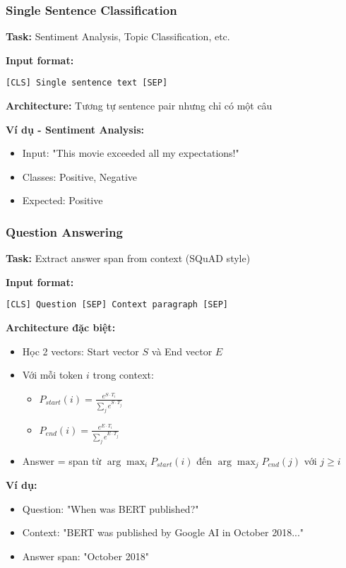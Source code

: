\subsubsection{Single Sentence Classification}  
\textbf{Task:} Sentiment Analysis, Topic Classification, etc.

\textbf{Input format:}
\begin{verbatim}
[CLS] Single sentence text [SEP]
\end{verbatim}

\textbf{Architecture:} Tương tự sentence pair nhưng chỉ có một câu

\textbf{Ví dụ - Sentiment Analysis:}
\begin{itemize}
    \item Input: "This movie exceeded all my expectations!"
    \item Classes: Positive, Negative
    \item Expected: Positive
\end{itemize}

\subsubsection{Question Answering}
\textbf{Task:} Extract answer span from context (SQuAD style)

\textbf{Input format:}
\begin{verbatim}
[CLS] Question [SEP] Context paragraph [SEP]
\end{verbatim}

\textbf{Architecture đặc biệt:}
\begin{itemize}
    \item Học 2 vectors: Start vector $S$ và End vector $E$
    \item Với mỗi token $i$ trong context:
    \begin{itemize}
        \item $P_{start}(i) = \frac{e^{S \cdot T_i}}{\sum_j e^{S \cdot T_j}}$
        \item $P_{end}(i) = \frac{e^{E \cdot T_i}}{\sum_j e^{E \cdot T_j}}$
    \end{itemize}
    \item Answer = span từ $\arg\max_i P_{start}(i)$ đến $\arg\max_j P_{end}(j)$ với $j \geq i$
\end{itemize}

\textbf{Ví dụ:}
\begin{itemize}
    \item Question: "When was BERT published?"
    \item Context: "BERT was published by Google AI in October 2018..."
    \item Answer span: "October 2018"
\end{itemize}


